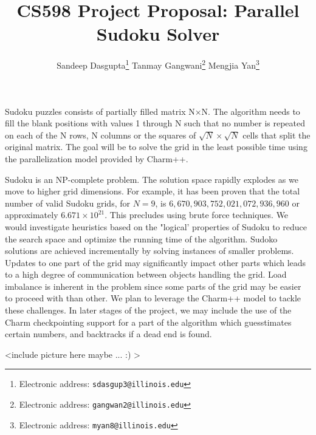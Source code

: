 \documentclass[10pt,twoside]{article}
\title{\textbf{ CS598 Project Proposal: Parallel Sudoku Solver}}
\author{Sandeep Dasgupta\thanks{Electronic address: \texttt{sdasgup3@illinois.edu}}
\qquad Tanmay Gangwani\thanks{Electronic address: \texttt{gangwan2@illinois.edu}}
\qquad  Mengjia Yan\thanks{Electronic address:
\texttt{myan8@illinois.edu}}}
\newcommand{\cmnt}[1]{}
\begin{document}
\thispagestyle{empty}

\maketitle

  Sudoku puzzles consists of partially filled matrix N×N. The algorithm needs
  to fill the blank positions with values 1 through N such that no number is
  repeated on each of the N rows, N columns or the squares of $\sqrt{N} \times
  \sqrt{N} $ cells that split the original matrix.  The goal will be to solve
  the grid in the least possible time using the parallelization model provided by Charm++.

  Sudoku is an NP-complete problem. The solution space rapidly explodes as we move to 
  higher grid dimensions. For example, it has been proven that the total number of
  valid Sudoku grids, for $N = 9$,  is $6,670,903,752,021,072,936,960$ or
  approximately $6.671 \times 10^{21}$. This precludes using brute force techniques. We would 
  investigate heuristics based on the "logical' properties of Sudoku to reduce the search space 
  and optimize the running time of the algorithm. Sudoko solutions are achieved incrementally by 
  solving instances of smaller problems. Updates to one part of the grid may significantly
  impact other parts which leads to a high degree of communication between objects handling the 
  grid. Load imbalance is inherent in the problem since some parts of the grid may be easier to
  proceed with than other. We plan to leverage the Charm++ model to tackle these challenges. In later 
  stages of the project, we may include the use of the Charm checkpointing support for a part of the
  algorithm which guesstimates certain numbers, and backtracks if a dead end is found.
  
  <include picture here maybe ...  :) >


\cmnt{
  On many occasions the humanistic algorithm returns a board with unfilled cells
  left, where they apply some brute force methods which involves some  heuristics
  to choose a value for a cell and see if that helps to solve a puzzle and many a times 
  that end up being wrong guess. To work around the problem, “backtracking” 
  ( or simply, undoing the puzzle 
      to a previous state just before the wrong guess is made and to  continue from there 
      by taking a different guess). Checkpoint/Restart
}
  
  



%
\end{document}
